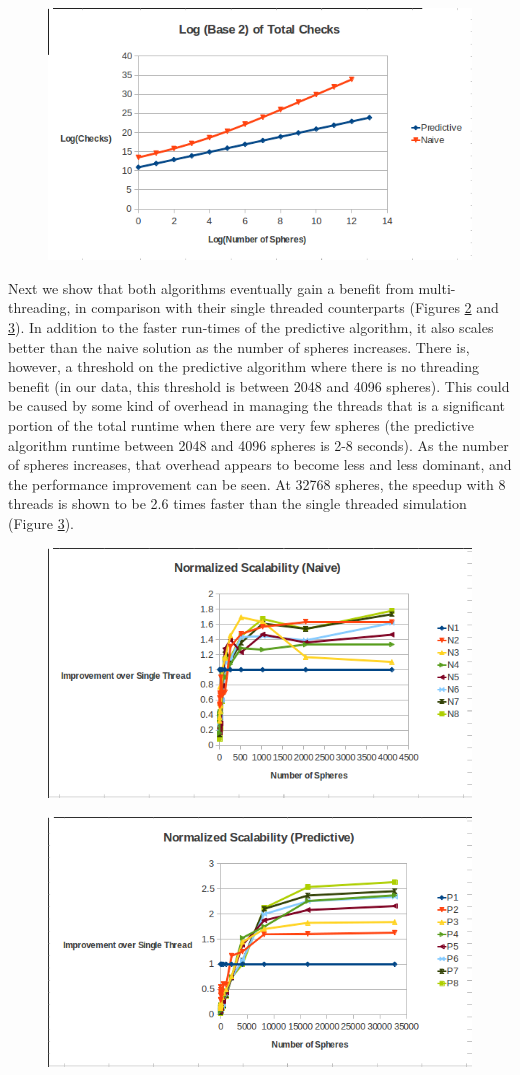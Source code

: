 \documentclass[CEJCS,PDF]{cej} %
\begin{document}
\begin{center}
\begin{figure}
	\includegraphics[width=.45\textwidth]{log_total_checks_comparison.png}
	\label{log_checks_compare}
\end{figure}
\end{center}

Next we show that both algorithms eventually gain a benefit from multi-threading, in comparison with their single threaded counterparts (Figures \ref{scalability_naive} and \ref{scalability_predict}).  In addition to the faster run-times of the predictive algorithm, it also scales better than the naive solution as the number of spheres increases.  There is, however, a threshold on the predictive algorithm where there is no threading benefit (in our data, this threshold is between 2048 and 4096 spheres).  This could be caused by some kind of overhead in managing the threads that is a significant portion of the total runtime when there are very few spheres (the predictive algorithm runtime between 2048 and 4096 spheres is 2-8 seconds).  As the number of spheres increases, that overhead appears to become less and less dominant, and the performance improvement can be seen.  At 32768 spheres, the speedup with 8 threads is shown to be 2.6 times faster than the single threaded simulation (Figure \ref{scalability_predict}).

\begin{center}
\begin{figure}
	\includegraphics[width=.45\textwidth]{normalized_scalability_naive.png}
	\label{scalability_naive}
\end{figure}
\end{center}

\begin{center}
\begin{figure}
	\includegraphics[width=.45\textwidth]{normalized_scalability_predictive.png}
	\label{scalability_predict}
\end{figure}
\end{center}
\end{document}
